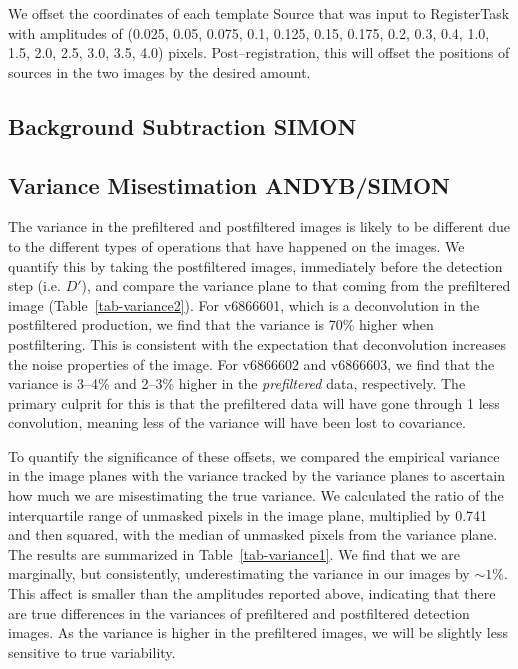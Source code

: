 \documentclass[prd, nofootinbib, floatfix, 11pt,tightenlines,times]{article}
\begin{document}
We offset the coordinates of each template Source that was input to
RegisterTask with amplitudes of (0.025, 0.05, 0.075, 0.1, 0.125, 0.15,
0.175, 0.2, 0.3, 0.4, 1.0, 1.5, 2.0, 2.5, 3.0, 3.5, 4.0) pixels.
Post--registration, this will offset the positions of sources in the
two images by the desired amount.

\subsection{Background Subtraction {\bf SIMON} \label{sec-bg}}

\subsection{Variance Misestimation {\bf ANDYB/SIMON}}

The variance in the prefiltered and postfiltered images is likely to
be different due to the different types of operations that have
happened on the images.  We quantify this by taking the postfiltered
images, immediately before the detection step (i.e. $D'$), and compare
the variance plane to that coming from the prefiltered image
(Table~\ref{tab-variance2}).  For v6866601, which is a deconvolution
in the postfiltered production, we find that the variance is 70\%
higher when postfiltering.  This is consistent with the expectation
that deconvolution increases the noise properties of the image.  For
v6866602 and v6866603, we find that the variance is 3--4\% and 2--3\%
higher in the {\it prefiltered} data, respectively.  The primary
culprit for this is that the prefiltered data will have gone through 1
less convolution, meaning less of the variance will have been lost to
covariance.

To quantify the significance of these offsets, we compared the
empirical variance in the image planes with the variance tracked by
the variance planes to ascertain how much we are misestimating the
true variance.  We calculated the ratio of the interquartile range of
unmasked pixels in the image plane, multiplied by 0.741 and then
squared, with the median of unmasked pixels from the variance plane.
The results are summarized in Table~\ref{tab-variance1}.  We find that
we are marginally, but consistently, underestimating the variance in
our images by $\sim 1\%$.  This affect is smaller than the amplitudes
reported above, indicating that there are true differences in the
variances of prefiltered and postfiltered detection images.  As the
variance is higher in the prefiltered images, we will be slightly less
sensitive to true variability.
\end{document}
